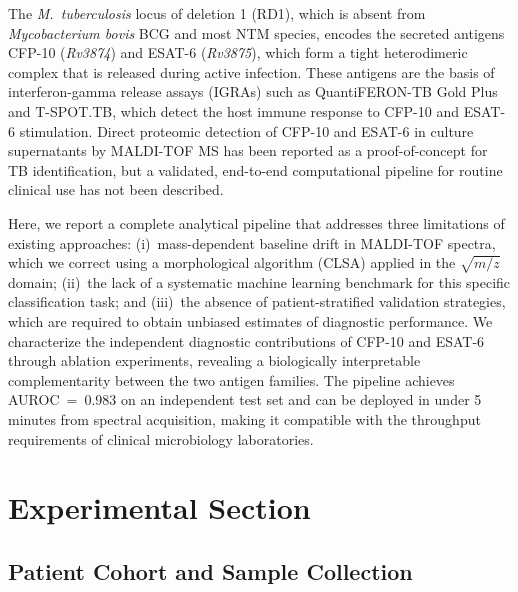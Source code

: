 \documentclass[journal=ancham, manuscript=article, layout=traditional]{achemso}
\begin{document}
The \textit{M.~tuberculosis} locus of deletion 1 (RD1), which is
absent from \textit{Mycobacterium bovis} BCG and most NTM species,
encodes the secreted antigens CFP-10 (\textit{Rv3874}) and ESAT-6
(\textit{Rv3875}), which form a tight heterodimeric complex that is
released during active infection.\cite{Berthet1998, Sorensen1995}
These antigens are the basis of interferon-gamma release assays
(IGRAs) such as QuantiFERON-TB Gold Plus and T-SPOT.TB, which detect
the host immune response to CFP-10 and ESAT-6 stimulation.\cite{Mori2004,
Pai2016IGRA}
Direct proteomic detection of CFP-10 and ESAT-6 in culture
supernatants by MALDI-TOF MS has been reported as a proof-of-concept
for TB identification,\cite{El_Khechine2011, Lotz2010} but a
validated, end-to-end computational pipeline for routine clinical use
has not been described.

Here, we report a complete analytical pipeline that addresses three
limitations of existing approaches: (i)~mass-dependent baseline
drift in MALDI-TOF spectra, which we correct using a morphological
algorithm (CLSA) applied in the $\sqrt{m/z}$ domain; (ii)~the lack of
a systematic machine learning benchmark for this specific
classification task; and (iii)~the absence of patient-stratified
validation strategies, which are required to obtain unbiased estimates
of diagnostic performance.
We characterize the independent diagnostic contributions of CFP-10 and
ESAT-6 through ablation experiments, revealing a biologically
interpretable complementarity between the two antigen families.
The pipeline achieves AUROC~=~0.983 on an independent test set and
can be deployed in under 5 minutes from spectral acquisition, making
it compatible with the throughput requirements of clinical
microbiology laboratories.

\section{Experimental Section}

\subsection{Patient Cohort and Sample Collection}

\end{document}
